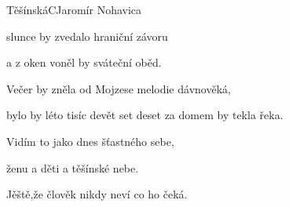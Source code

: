 \begin{song}{Těšínská}{C}{Jaromír Nohavica}
\begin{SBVerse}
slunce by zvedalo hraniční závoru

a z oken voněl by sváteční oběd.

\end{SBVerse}

\begin{SBVerse}

Večer by zněla od Mojzese melodie dávnověká,

bylo by léto tisíc devět set deset za domem by tekla řeka.

Vidím to jako dnes šťastného sebe,

ženu a děti a těšínské nebe.

Jěště,že člověk nikdy neví co ho čeká.

\end{SBVerse}

\end{song}

\clearpage
